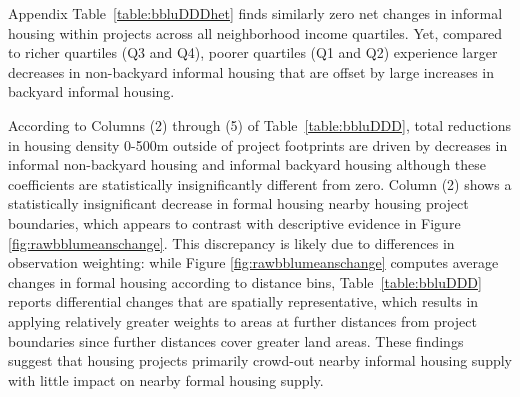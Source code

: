 \documentclass[12pt]{article}
\begin{document}
Appendix Table~\ref{table:bbluDDDhet} finds similarly zero net changes in informal housing within projects across all neighborhood income quartiles.  Yet, compared to richer quartiles (Q3 and Q4), poorer quartiles (Q1 and Q2) experience larger decreases in non-backyard informal housing that are offset by large increases in backyard informal housing.

According to Columns (2) through (5) of Table~\ref{table:bbluDDD}, total reductions in housing density 0-500m outside of project footprints are driven by decreases in informal non-backyard housing and informal backyard housing although these coefficients are statistically insignificantly different from zero.  Column (2) shows a statistically insignificant decrease in formal housing nearby housing project boundaries, which appears to contrast with descriptive evidence in Figure \ref{fig:rawbblumeanschange}.  This discrepancy is likely due to differences in observation weighting: while Figure \ref{fig:rawbblumeanschange} computes average changes in formal housing according to distance bins, Table~\ref{table:bbluDDD} reports differential changes that are spatially representative, which results in applying relatively greater weights to areas at further distances from project boundaries since further distances cover greater land areas.  These findings suggest that housing projects primarily crowd-out nearby informal housing supply with little impact on nearby formal housing supply.


\end{document}
